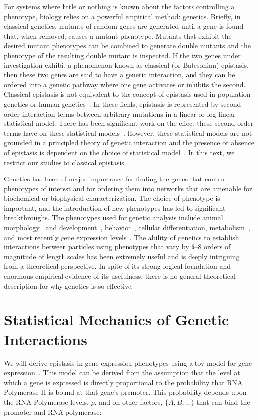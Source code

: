 For systems where little or nothing is known about the factors controlling a
phenotype, biology relies on a powerful empirical method: genetics.
Briefly, in classical genetics, mutants of random genes are generated until a
gene is found that, when removed, causes a mutant phenotype. Mutants that
exhibit the desired mutant phenotypes can be combined to generate double mutants
and the phenotype of the resulting double mutant is inspected. If the two genes
under investigation exhibit a phenomenon known as classical (or Batesonian)
epistasis, then these two genes are said to have a genetic interaction, and they
can be ordered into a genetic pathway where one gene activates or inhibits the
second. Classical epistasis is not equivalent to the concept of epistasis used
in population genetics or human genetics~\citep{Cordell2002}. In these fields,
epistasis is represented by second order interaction terms between arbitrary
mutations in a linear or log-linear statistical model. There has been
significant work on the effect these second order terms have on these
statistical models~\citep{Crow2010,Mackay2014}. However, these statistical
models are not grounded in a principled theory of genetic interaction and the
presence or absence of epistasis is dependent on the choice of statistical
model~\citep{Cordell2002}. In this text, we restrict our studies to classical
epistasis.

Genetics has been of major importance for finding the genes that control
phenotypes of interest and for ordering them into networks that are amenable for
biochemical or biophysical characterization. The choice of phenotype is
important, and the introduction of new phenotypes has led to significant
breakthroughs. The phenotypes used for genetic analysis include animal
morphology~\citep{Brenner1974} and development~\citep{Jurgens1984},
behavior~\citep{Benzer1967}, cellular differentiation,
metabolism~\citep{Beadle499}, and most recently gene expression
levels~\citep{Angeles-Albores2018a,Hughes2000,Capaldi2008}. The ability of
genetics to establish interactions between particles using phenotypes that vary
by 6--8 orders of magnitude of length scales has been extremely useful and is
deeply intriguing from a theoretical perspective. In spite of its strong logical
foundation and enormous empirical evidence of its usefulness, there is no
general theoretical description for why genetics is so effective.

\section*{Statistical Mechanics of Genetic Interactions}
We will derive epistasis in gene expression phenotypes using a toy model for
gene expression~\citep{Garcia2007a,Bintu2005a}. This model can be derived from
the assumption that the level at which a gene is expressed is directly
proportional to the probability that RNA Polymerase II is bound at that gene's
promoter. This probability depends upon the RNA Polymerase levels, \( \rho \),
and on other factors, \( \{A, B, \ldots \} \) that can bind the promoter and RNA
polymerase:

